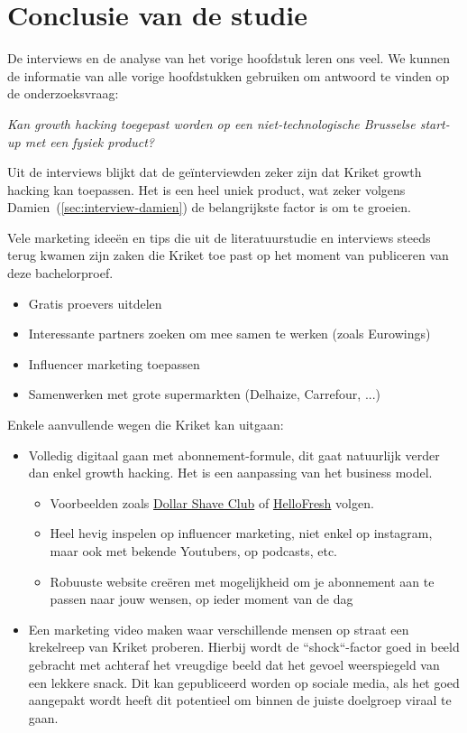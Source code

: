 
\chapter{Conclusie van de studie}
\label{ch:conclusie}

De interviews en de analyse van het vorige hoofdstuk leren ons veel. We kunnen de informatie van alle vorige hoofdstukken gebruiken om antwoord te vinden op de onderzoeksvraag:

\emph{Kan growth hacking toegepast worden op een niet-technologische Brusselse start-up met een fysiek product?}

Uit de interviews blijkt dat de geïnterviewden zeker zijn dat Kriket growth hacking kan toepassen. Het is een heel uniek product, wat zeker volgens Damien~(\ref{sec:interview-damien}) de belangrijkste factor is om te groeien. 

Vele marketing ideeën en tips die uit de literatuurstudie en interviews steeds terug kwamen zijn zaken die Kriket toe past op het moment van publiceren van deze bachelorproef. 
\begin{itemize}
	\item Gratis proevers uitdelen
	\item Interessante partners zoeken om mee samen te werken (zoals Eurowings)
	\item Influencer marketing toepassen
	\item Samenwerken met grote supermarkten (Delhaize, Carrefour, ...)
\end{itemize}

Enkele aanvullende wegen die Kriket kan uitgaan:
\begin{itemize}
	\item Volledig digitaal gaan met abonnement-formule, dit gaat natuurlijk verder dan enkel growth hacking. Het is een aanpassing van het business model.
	\begin{itemize}
		\item Voorbeelden zoals \href{https://www.dollarshaveclub.com/}{Dollar Shave Club} of \href{https://www.hellofresh.be/}{HelloFresh} volgen.
		\item Heel hevig inspelen op influencer marketing, niet enkel op instagram, maar ook met bekende Youtubers, op podcasts, etc.
		\item Robuuste website creëren met mogelijkheid om je abonnement aan te passen naar jouw wensen, op ieder moment van de dag
	\end{itemize}
	\item Een marketing video maken waar verschillende mensen op straat een krekelreep van Kriket proberen. Hierbij wordt de ``shock``-factor goed in beeld gebracht met achteraf het vreugdige beeld dat het gevoel weerspiegeld van een lekkere snack. Dit kan gepubliceerd worden op sociale media, als het goed aangepakt wordt heeft dit potentieel om binnen de juiste doelgroep viraal te gaan.
\end{itemize}

